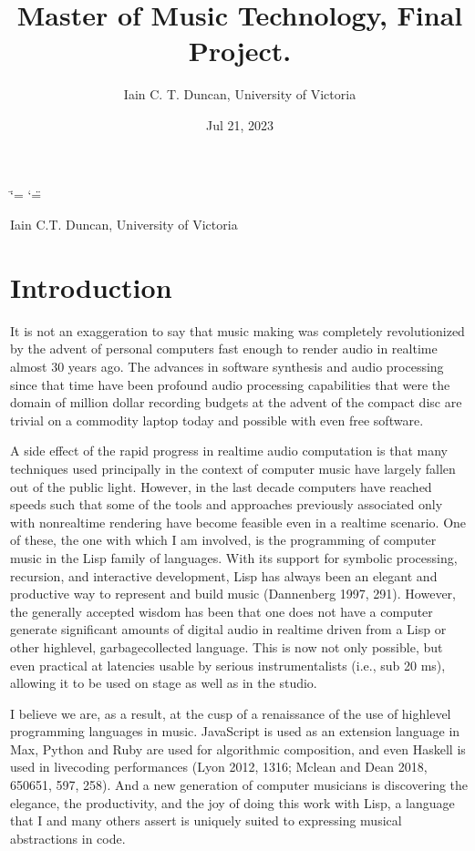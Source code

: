 \documentclass[letterpaper,10pt,english]{sphinxmanual}
\title{Master of Music Technology, Final Project.\@{}}
\date{Jul 21, 2023}
\author{Iain C.\@{} T.\@{} Duncan, University of Victoria}
\begin{document}
\ifdefined\shorthandoff
  \ifnum\catcode`\=\string=\active\shorthandoff{=}\fi
  \ifnum\catcode`\"=\active{}\fi
\fi

\pagestyle{empty}
\sphinxmaketitle
\pagestyle{plain}
\sphinxtableofcontents
\pagestyle{normal}
\label{\detokenize{index::doc}}


\sphinxAtStartPar
Iain C.T. Duncan, University of Victoria

\sphinxstepscope


\chapter{Introduction}
\label{\detokenize{introduction:introduction}}\label{\detokenize{introduction::doc}}
\sphinxAtStartPar
It is not an exaggeration to say that music making was
completely revolutionized by the advent of personal computers fast
enough to render audio in realtime almost 30 years ago. The advances
in software synthesis and audio processing since that time have been profound \sphinxhyphen{}
audio processing capabilities that were the domain of million dollar recording budgets
at the advent of the compact disc are trivial on a commodity laptop today and possible
with even free software.

\sphinxAtStartPar
A side effect of the rapid progress in realtime audio computation is that many techniques
used principally in the context of  computer music have largely fallen out of the public light.
However, in the last decade computers have reached speeds such that some of the
tools and approaches previously associated only with non\sphinxhyphen{}realtime rendering have become
feasible even in a realtime scenario.
One of these, the one with which I am involved, is the programming of computer music in the
Lisp family of languages.
With its support for symbolic processing, recursion, and interactive development,
Lisp has always been an elegant and productive way to represent and build music (Dannenberg 1997, 291).
However, the generally accepted wisdom has been that one does not have a computer
generate significant amounts of digital audio in realtime driven from a Lisp
or other high\sphinxhyphen{}level, garbage\sphinxhyphen{}collected language.
This is now not only possible, but even practical at latencies usable by serious instrumentalists
(i.e., sub 20 ms), allowing it to be used on stage as well as in the studio.

\sphinxAtStartPar
I believe we are, as a result, at the cusp of a renaissance of the use of high\sphinxhyphen{}level programming languages in music.
JavaScript is used as an extension language in Max,
Python and Ruby are used for algorithmic composition,
and even Haskell is used in live\sphinxhyphen{}coding performances
(Lyon 2012, 13\sphinxhyphen{}16; Mclean and Dean 2018, 650\sphinxhyphen{}651, 597, 258).
And a new generation of computer
musicians is discovering the elegance, the productivity, and the joy of doing this work
with Lisp, a language that I and many others assert is uniquely suited to expressing musical
abstractions in code.
\end{document}
